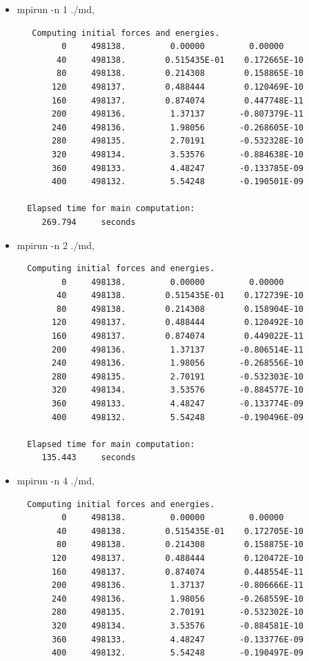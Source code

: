 \documentclass{article}
\begin{document}
\begin{itemize}
\item mpirun -n 1 ./md,
  {\tiny{\begin{verbatim}
   Computing initial forces and energies.
         0     498138.         0.00000         0.00000
        40     498138.        0.515435E-01    0.172665E-10
        80     498138.        0.214308        0.158865E-10
       120     498137.        0.488444        0.120469E-10
       160     498137.        0.874074        0.447748E-11
       200     498136.         1.37137       -0.807379E-11
       240     498136.         1.98056       -0.268605E-10
       280     498135.         2.70191       -0.532328E-10
       320     498134.         3.53576       -0.884638E-10
       360     498133.         4.48247       -0.133785E-09
       400     498132.         5.54248       -0.190501E-09

  Elapsed time for main computation:
     269.794     seconds
   \end{verbatim}   }}




\item mpirun -n 2 ./md,
  {\tiny{\begin{verbatim}
  Computing initial forces and energies.
         0     498138.         0.00000         0.00000
        40     498138.        0.515435E-01    0.172739E-10
        80     498138.        0.214308        0.158904E-10
       120     498137.        0.488444        0.120492E-10
       160     498137.        0.874074        0.449022E-11
       200     498136.         1.37137       -0.806514E-11
       240     498136.         1.98056       -0.268556E-10
       280     498135.         2.70191       -0.532303E-10
       320     498134.         3.53576       -0.884577E-10
       360     498133.         4.48247       -0.133774E-09
       400     498132.         5.54248       -0.190496E-09

  Elapsed time for main computation:
     135.443     seconds
   \end{verbatim}   }}













\item mpirun -n 4 ./md,
  {\tiny{\begin{verbatim}
  Computing initial forces and energies.
         0     498138.         0.00000         0.00000
        40     498138.        0.515435E-01    0.172705E-10
        80     498138.        0.214308        0.158875E-10
       120     498137.        0.488444        0.120472E-10
       160     498137.        0.874074        0.448554E-11
       200     498136.         1.37137       -0.806666E-11
       240     498136.         1.98056       -0.268559E-10
       280     498135.         2.70191       -0.532302E-10
       320     498134.         3.53576       -0.884581E-10
       360     498133.         4.48247       -0.133776E-09
       400     498132.         5.54248       -0.190497E-09


\end{verbatim}}}
\end{itemize}
\end{document}
